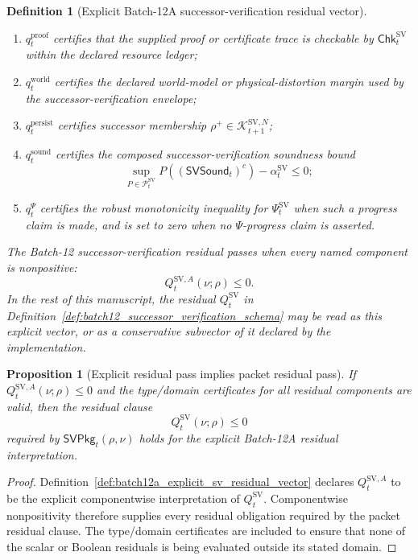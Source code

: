 \documentclass[11pt]{article}
\newtheorem{proposition}[theorem]{Proposition}
\newtheorem{definition}[theorem]{Definition}
\newcommand{\Pcal}{\mathcal{P}}
\newcommand{\1}{\mathbf{1}}
\providecommand{\Kcal}{\mathcal{K}}
\begin{document}
\begin{definition}[Explicit Batch-12A successor-verification residual vector]
\begin{enumerate}[label=(\roman*),leftmargin=1.5em]
    \item \(q_t^{\mathrm{proof}}\) certifies that the supplied proof or certificate trace is checkable by \(\mathsf{Chk}_t^{\mathrm{SV}}\) within the declared resource ledger;
    \item \(q_t^{\mathrm{world}}\) certifies the declared world-model or physical-distortion margin used by the successor-verification envelope;
    \item \(q_t^{\mathrm{persist}}\) certifies successor membership \(\rho^+\in\Kcal_{t+1}^{\mathrm{SV},N}\);
    \item \(q_t^{\mathrm{sound}}\) certifies the composed successor-verification soundness bound
    \[
    \sup_{P\in\Pcal_t^{\mathrm{SV}}}P((\mathsf{SVSound}_t)^c)-\alpha_t^{\mathrm{SV}}\le0;
    \]
    \item \(q_t^{\Psi}\) certifies the robust monotonicity inequality for \(\Psi_t^{\mathrm{SV}}\) when such a progress claim is made, and is set to zero when no \(\Psi\)-progress claim is asserted.
\end{enumerate}
The Batch-12 successor-verification residual passes when every named component is nonpositive:
\[
Q_t^{\mathrm{SV},A}(\nu;\rho)\le0.
\]
In the rest of this manuscript, the residual \(Q_t^{\mathrm{SV}}\) in Definition~\ref{def:batch12_successor_verification_schema} may be read as this explicit vector, or as a conservative subvector of it declared by the implementation.
\end{definition}

\begin{proposition}[Explicit residual pass implies packet residual pass]
\label{prop:batch12a_explicit_residuals_imply_packet_pass}
If \(Q_t^{\mathrm{SV},A}(\nu;\rho)\le0\) and the type/domain certificates for all residual components are valid, then the residual clause
\[
Q_t^{\mathrm{SV}}(\nu;\rho)\le0
\]
required by \(\mathsf{SVPkg}_t(\rho,\nu)\) holds for the explicit Batch-12A residual interpretation.
\end{proposition}

\begin{proof}
Definition~\ref{def:batch12a_explicit_sv_residual_vector} declares \(Q_t^{\mathrm{SV},A}\) to be the explicit componentwise interpretation of \(Q_t^{\mathrm{SV}}\).  Componentwise nonpositivity therefore supplies every residual obligation required by the packet residual clause.  The type/domain certificates are included to ensure that none of the scalar or Boolean residuals is being evaluated outside its stated domain.
\end{proof}
\end{document}
